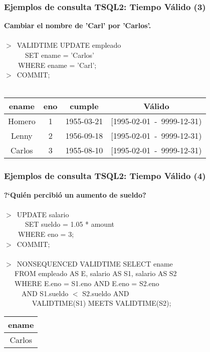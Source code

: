 \documentclass[12pt]{beamer}
\begin{document}
\begin{frame}
\frametitle{Ejemplos de consulta TSQL2: Tiempo V\'alido (3)}
\textbf{Cambiar el nombre de 'Carl' por 'Carlos'.}\\
\ \\
$>$\ VALIDTIME UPDATE empleado\\
\ \ \ \ \ \ SET ename = 'Carlos'\\
\ \ \ \ WHERE ename = 'Carl';\\
$>$\ COMMIT;\\
\ \\
\begin{center}
\begin{tabular}{|c|c|c||c|}
\hline
ename & eno & cumple & V\'alido\\
\hline
Homero & 1 & 1955-03-21 & [1995-02-01\ -\ 9999-12-31)\\
\hline
Lenny & 2 & 1956-09-18 & [1995-02-01\ -\ 9999-12-31)\\
\hline
Carlos & 3 & 1955-08-10 & [1995-02-01\ -\ 9999-12-31)\\
\hline
\end{tabular}
\end{center}
\end{frame}

\begin{frame}
\frametitle{Ejemplos de consulta TSQL2: Tiempo V\'alido (4)}
\textbf{?`Qui\'en percibi\'o un aumento de sueldo?}\\
\ \\
$>$\ UPDATE salario\\
\ \ \ \ \ \ SET sueldo = 1.05 * amount\\
\ \ \ \ WHERE eno = 3;\\
$>$\ COMMIT;\\
\ \\
$>$\ NONSEQUENCED VALIDTIME SELECT ename\\
\ \ \ FROM empleado AS E, salario AS S1, salario AS S2\\
\ \ \ WHERE E.eno = S1.eno AND E.eno = S2.eno\\
\ \ \ \ \ AND S1.sueldo $<$ S2.sueldo AND \\
\ \ \ \ \ \ \ \ VALIDTIME(S1) MEETS VALIDTIME(S2);\\
\begin{center}
\begin{tabular}{|c|}
\hline
ename\\
\hline
Carlos\\
\hline
\end{tabular}
\end{center}
\end{frame}
\end{document}
